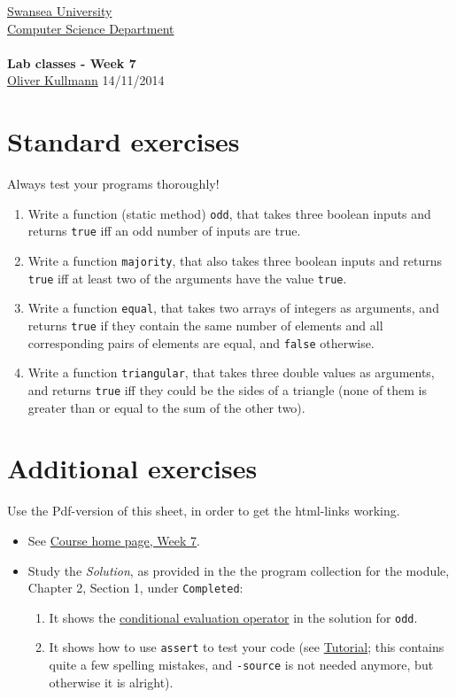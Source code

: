 \documentclass[11pt]{article}
\newcommand{\Java}{\lstset{language=Java,keywordstyle=\bfseries,breaklines,breakindent=30pt}}
\begin{document}
\begin{center}
  \href{http://www.swan.ac.uk/}{Swansea University}\\
  \href{http://www.swan.ac.uk/compsci/}{Computer Science Department}\\[1ex]
  \href{\chp}{\module}\\[1ex]
  \textbf{Lab classes - Week 7}\\
  \href{http://cs.swan.ac.uk/~csoliver}{Oliver Kullmann} 14/11/2014
\end{center}


\section{Standard exercises}
\label{sec:stdex}

\Java

Always test your programs thoroughly!

\begin{enumerate}
\item Write a function (static method) \texttt{odd}, that takes three boolean inputs and returns \texttt{true} iff an odd number of inputs are true.
\item Write a function \texttt{majority}, that also takes three boolean inputs and returns \texttt{true} iff at least two of the arguments have the value \texttt{true}.
\item Write a function \texttt{equal}, that takes two arrays of integers as arguments, and returns \texttt{true} if they contain the same number of elements and all corresponding pairs of elements are equal, and \texttt{false} otherwise.
\item Write a function \texttt{triangular}, that takes three double values as arguments, and returns \texttt{true} iff they could be the sides of a triangle (none of them is greater than or equal to the sum of the other two). 
\end{enumerate}


\section{Additional exercises}
\label{sec:addex}

Use the Pdf-version of this sheet, in order to get the html-links working.
\begin{itemize}
\item See \href{\chp#ExercisesWeek07}{Course home page, Week 7}.
\item Study the \emph{Solution}, as provided in the the program collection for the module, Chapter 2, Section 1, under \texttt{Completed}:
  \begin{enumerate}
  \item It shows the \href{http://www.cafeaulait.org/course/week2/43.html}{conditional evaluation operator} in the solution for \texttt{odd}.
  \item It shows how to use \texttt{assert} to test your code (see \href{http://sqa.fyicenter.com/FAQ/JUnit/What_Is_Java_assert_Statement_.html}{Tutorial}; this contains quite a few spelling mistakes, and \texttt{-source} is not needed anymore, but otherwise it is alright).
  \end{enumerate}
\end{itemize}
\end{document}
